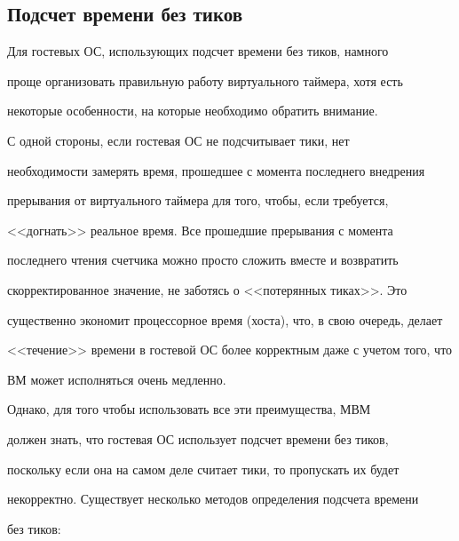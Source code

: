 \subsection{Подсчет времени без тиков}





     Для гостевых ОС, использующих подсчет времени без тиков, намного 


проще организовать правильную работу виртуального таймера, хотя есть 


некоторые особенности, на которые необходимо обратить внимание.


     


     С одной стороны, если гостевая ОС не подсчитывает тики, нет 


необходимости замерять время, прошедшее с момента последнего внедрения 


прерывания от виртуального таймера для того, чтобы, если требуется, 


<<догнать>> реальное время. Все прошедшие прерывания с момента 


последнего чтения счетчика можно просто сложить вместе и возвратить 


скорректированное значение, не заботясь о <<потерянных тиках>>. Это 


существенно экономит процессорное время (хоста), что, в свою очередь, делает 


<<течение>> времени в гостевой ОС более корректным даже с учетом того, что 


ВМ может исполняться очень медленно.


     


     Однако, для того чтобы использовать все эти преимущества, МВМ 


должен знать, что гостевая ОС использует подсчет времени без тиков, 


поскольку если она на самом деле считает тики, то пропускать их будет 


некорректно. Существует несколько методов определения подсчета времени 


без тиков:


